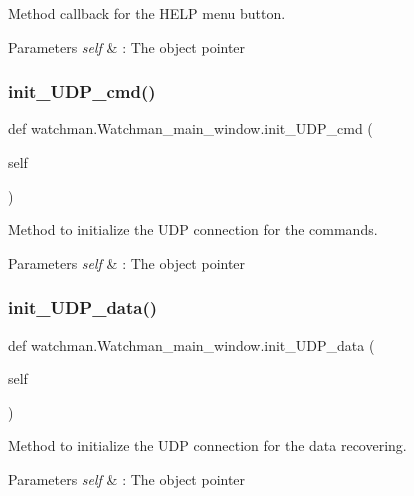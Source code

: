 Method callback for the H\+E\+LP menu button. 


\begin{DoxyParams}{Parameters}
{\em self} & \+: The object pointer \\
\hline
\end{DoxyParams}
\mbox{\label{classwatchman_1_1_watchman__main__window_a0a178263901747708694c0fd4aa2e3a7}} 
\subsubsection{init\_UDP\_cmd()}
{\footnotesize\ttfamily def watchman.\+Watchman\+\_\+main\+\_\+window.\+init\+\_\+\+U\+D\+P\+\_\+cmd (\begin{DoxyParamCaption}\item[{}]{self }\end{DoxyParamCaption})}



Method to initialize the U\+DP connection for the commands. 


\begin{DoxyParams}{Parameters}
{\em self} & \+: The object pointer \\
\hline
\end{DoxyParams}
\mbox{\label{classwatchman_1_1_watchman__main__window_a116e7145b9e06726e1c5318fd8719697}} 
\subsubsection{init\_UDP\_data()}
{\footnotesize\ttfamily def watchman.\+Watchman\+\_\+main\+\_\+window.\+init\+\_\+\+U\+D\+P\+\_\+data (\begin{DoxyParamCaption}\item[{}]{self }\end{DoxyParamCaption})}



Method to initialize the U\+DP connection for the data recovering. 


\begin{DoxyParams}{Parameters}
{\em self} & \+: The object pointer \\
\hline
\end{DoxyParams}
\mbox{\label{classwatchman_1_1_watchman__main__window_a9b2df908b2feab8ac290197298cc4a7e}} 
